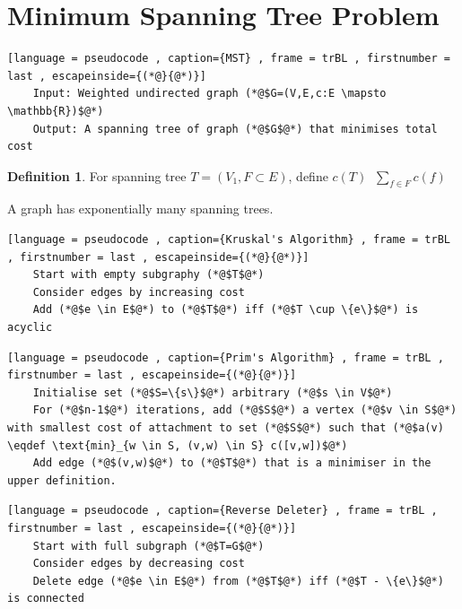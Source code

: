 \documentclass[a4paper]{article}
\theoremstyle{plain}
\newcommand*{\MyDef}{\mathrm{def}}
\newcommand*{\eqdef}{\ensuremath{\mathop{\overset{\MyDef}{=}}}}
\theoremstyle{definition}
\newtheorem{defn}{Definition}[section]
\theoremstyle{remark}
\begin{document}
	\section{Minimum Spanning Tree Problem}
	\begin{lstlisting}[language = pseudocode , caption={MST} , frame = trBL , firstnumber = last , escapeinside={(*@}{@*)}]
	Input: Weighted undirected graph (*@$G=(V,E,c:E \mapsto \mathbb{R})$@*)
	Output: A spanning tree of graph (*@$G$@*) that minimises total cost
	\end{lstlisting}
	\begin{defn}
		For spanning tree $T = (V_1,F \subset E)$, define $c(T) \eqdef \sum_{f \in F} c(f)$
	\end{defn}
	A graph has exponentially many spanning trees.
	\begin{lstlisting}[language = pseudocode , caption={Kruskal's Algorithm} , frame = trBL , firstnumber = last , escapeinside={(*@}{@*)}]
	Start with empty subgraphy (*@$T$@*)
	Consider edges by increasing cost
	Add (*@$e \in E$@*) to (*@$T$@*) iff (*@$T \cup \{e\}$@*) is acyclic
	\end{lstlisting}
	\begin{lstlisting}[language = pseudocode , caption={Prim's Algorithm} , frame = trBL , firstnumber = last , escapeinside={(*@}{@*)}]
	Initialise set (*@$S=\{s\}$@*) arbitrary (*@$s \in V$@*)
	For (*@$n-1$@*) iterations, add (*@$S$@*) a vertex (*@$v \in S$@*) with smallest cost of attachment to set (*@$S$@*) such that (*@$a(v) \eqdef \text{min}_{w \in S, (v,w) \in S} c([v,w])$@*)
	Add edge (*@$(v,w)$@*) to (*@$T$@*) that is a minimiser in the upper definition.
	\end{lstlisting}
	\begin{lstlisting}[language = pseudocode , caption={Reverse Deleter} , frame = trBL , firstnumber = last , escapeinside={(*@}{@*)}]
	Start with full subgraph (*@$T=G$@*)
	Consider edges by decreasing cost
	Delete edge (*@$e \in E$@*) from (*@$T$@*) iff (*@$T - \{e\}$@*) is connected
	\end{lstlisting}
\end{document}

